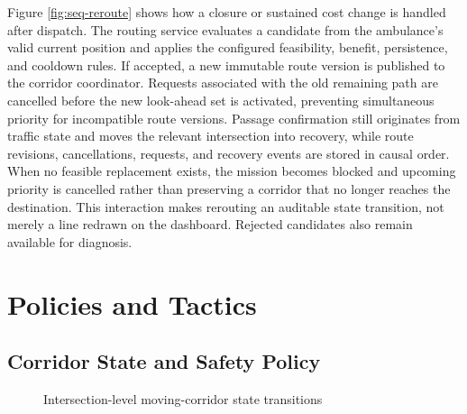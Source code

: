 Figure \ref{fig:seq-reroute} shows how a closure or sustained cost change is handled after dispatch. The routing service evaluates a candidate from the ambulance's valid current position and applies the configured feasibility, benefit, persistence, and cooldown rules. If accepted, a new immutable route version is published to the corridor coordinator. Requests associated with the old remaining path are cancelled before the new look-ahead set is activated, preventing simultaneous priority for incompatible route versions. Passage confirmation still originates from traffic state and moves the relevant intersection into recovery, while route revisions, cancellations, requests, and recovery events are stored in causal order. When no feasible replacement exists, the mission becomes blocked and upcoming priority is cancelled rather than preserving a corridor that no longer reaches the destination. This interaction makes rerouting an auditable state transition, not merely a line redrawn on the dashboard. Rejected candidates also remain available for diagnosis.

\section{Policies and Tactics}

\subsection{Corridor State and Safety Policy}
\label{sec:corridor-state}

\begin{figure}[htbp]
\centering
{}
\caption{Intersection-level moving-corridor state transitions}
\label{fig:corridor-state}
\end{figure}

